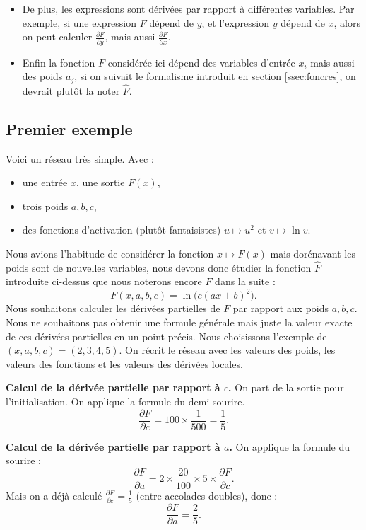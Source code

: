 {\begin{itemize}
		\item De plus, les expressions sont dérivées par rapport à différentes variables. Par exemple, si une expression $F$ dépend de $y$, et l'expression $y$ dépend de $x$, alors on peut calculer  $\frac{\partial F}{\partial y}$, mais aussi $\frac{\partial F}{\partial x}$. 
		
		\item Enfin la fonction $F$ considérée ici dépend des variables d'entrée $x_i$ mais aussi des poids $a_j$, si on suivait le formalisme introduit en section \ref{ssec:foncres}, on devrait plutôt la noter  $\widehat F$.
	\end{itemize}


\subsection{Premier exemple}

Voici un réseau très simple.
Avec :
\begin{itemize}
	\item une entrée $x$, une sortie $F(x)$,
	\item trois poids $a,b,c$,
	\item des fonctions d'activation (plutôt fantaisistes) $u \mapsto u^2$ et $v \mapsto \ln v$.
\end{itemize}
Nous avions l'habitude de considérer la fonction $x \mapsto F(x)$ mais dorénavant les poids sont de nouvelles variables, nous devons donc étudier la fonction 
$\widehat F$ introduite ci-dessus que nous noterons encore $F$ dans la suite :
$$F(x,a,b,c) = \ln\big( c (ax+b)^2 \big).$$
Nous souhaitons calculer les dérivées partielles de $F$ par rapport aux poids $a,b,c$. Nous ne souhaitons pas obtenir une formule générale mais juste la valeur exacte de ces dérivées partielles en un point précis. Nous choisissons l'exemple de 
$(x,a,b,c) = (2,3,4,5)$.
On récrit le réseau avec les valeurs des poids, les valeurs des fonctions et les valeurs des dérivées locales.


\textbf{Calcul de la dérivée partielle par rapport à $c$.}
On part de la sortie pour l'initialisation. On applique la formule du demi-sourire.
$$\frac{\partial F}{\partial c} = 100 \times \frac{1}{500} = \frac15.$$

\textbf{Calcul de la dérivée partielle par rapport à $a$.}
On applique la formule du sourire :
$$\frac{\partial F}{\partial a} = 2 \times \frac{20}{100} \times 5 \times \frac{\partial F}{\partial c}.$$
Mais on a déjà calculé $\frac{\partial F}{\partial c}=\frac15$ (entre accolades doubles), donc :
$$\frac{\partial F}{\partial a} = \frac25.$$

}
